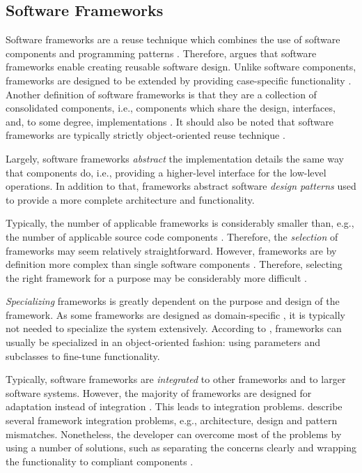 \subsection{Software Frameworks}

Software frameworks are a reuse technique which combines the use of software components and programming patterns \citep{johnson_frameworkscomponents+_1997}. Therefore, \citet{johnson_frameworkscomponents+_1997} argues that software frameworks enable creating reusable software design. Unlike software components, frameworks are designed to be extended by providing case-specific functionality \citep{lambeau_software_2011}. Another definition of software frameworks is that they are a collection of consolidated components, i.e., components which share the design, interfaces, and, to some degree, implementations \citep{johnson_frameworkscomponents+_1997}. It should also be noted that software frameworks are typically strictly object-oriented reuse technique \citep{johnson_frameworkscomponents+_1997}.

Largely, software frameworks \emph{abstract} the implementation details the same way that components do, i.e., providing a higher-level interface for the low-level operations. In addition to that, frameworks abstract software \emph{design patterns} used to provide a more complete architecture and functionality.

Typically, the number of applicable frameworks is considerably smaller than, e.g., the number of applicable source code components \citep{fayad_enterprise_2000}. Therefore, the \emph{selection} of frameworks may seem relatively straightforward. However, frameworks are by definition more complex than single software components \citep{johnson_frameworkscomponents+_1997}. Therefore, selecting the right framework for a purpose may be considerably more difficult \citep{fayad_enterprise_2000}.

\emph{Specializing} frameworks is greatly dependent on the purpose and design of the framework. As some frameworks are designed as domain-specific \citep{johnson_frameworkscomponents+_1997}, it is typically not needed to specialize the system extensively. According to \citet{brugali_framework_1997}, frameworks can usually be specialized in an object-oriented fashion: using parameters and subclasses to fine-tune functionality.

Typically, software frameworks are \emph{integrated} to other frameworks and to larger software systems. However, the majority of frameworks are designed for adaptation instead of integration \citep{mattsson_framework_1999}. This leads to integration problems. \citet{mattsson_framework_1999} describe several framework integration problems, e.g., architecture, design and pattern mismatches. Nonetheless, the developer can overcome most of the problems by using a number of solutions, such as separating the concerns clearly and wrapping the functionality to compliant components \citep{mattsson_framework_1999}.

